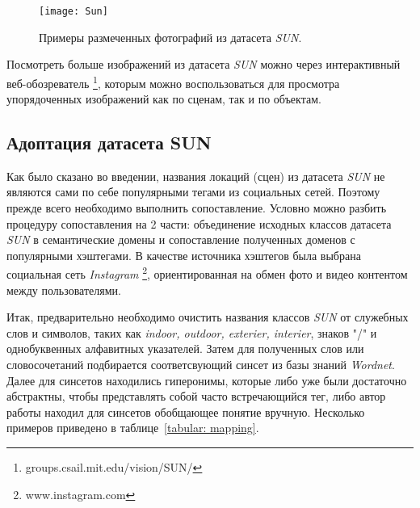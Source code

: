 \begin{figure}[ht!]
    \begin{center}
   	    \texttt{[image: Sun]}
   	\end{center}
   	\caption{Примеры размеченных фотографий из датасета \textit{SUN}.}
   	\label{tikzpicture: sun}
\end{figure}

Посмотреть больше изображений из датасета \textit{SUN} можно через 
интерактивный веб-обозреватель \footnote{groups.csail.mit.edu/vision/SUN/}, которым
можно воспользоваться для просмотра упорядоченных изображений как 
по сценам, так и по объектам.


\subsection{Адоптация датасета SUN}

\indent
\indent
Как было сказано во введении, названия локаций (сцен) из датасета \textit{SUN} не 
являются сами по себе популярными тегами из социальных сетей. Поэтому 
прежде всего необходимо выполнить сопоставление. Условно можно
разбить процедуру сопоставления на 2 части: объединение исходных классов 
датасета \textit{SUN} в семантические домены и сопоставление полученных доменов
с популярными хэштегами. В качестве источника хэштегов была выбрана социальная
сеть \textit{Instagram} \footnote{www.instagram.com}, ориентированная на обмен фото
и видео контентом между пользователями.

\indent
Итак, предварительно необходимо очистить названия классов \textit{SUN} от служебных
слов и символов, таких как \textit{indoor, outdoor, exterier, interier}, знаков "/" и 
однобуквенных алфавитных указателей. Затем для полученных слов или 
словосочетаний подбирается соответсвующий синсет из базы знаний \textit{Wordnet}.
Далее для синсетов находились гиперонимы, которые либо уже были достаточно
абстрактны, чтобы представлять собой часто встречающийся тег, либо 
автор работы находил для синсетов обобщающее понятие вручную.
Несколько примеров приведено в таблице~\ref{tabular: mapping}.


